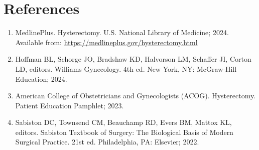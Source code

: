 \section*{References}
\begin{enumerate}
  \item MedlinePlus. Hysterectomy. U.S. National Library of Medicine; 2024. Available from: \url{https://medlineplus.gov/hysterectomy.html}
  
  \item Hoffman BL, Schorge JO, Bradshaw KD, Halvorson LM, Schaffer JI, Corton LD, editors. Williams Gynecology. 4th ed. New York, NY: McGraw-Hill Education; 2024.
  
  \item American College of Obstetricians and Gynecologists (ACOG). Hysterectomy. Patient Education Pamphlet; 2023.
  
  \item Sabiston DC, Townsend CM, Beauchamp RD, Evers BM, Mattox KL, editors. Sabiston Textbook of Surgery: The Biological Basis of Modern Surgical Practice. 21st ed. Philadelphia, PA: Elsevier; 2022.
\end{enumerate}

\clearpage
